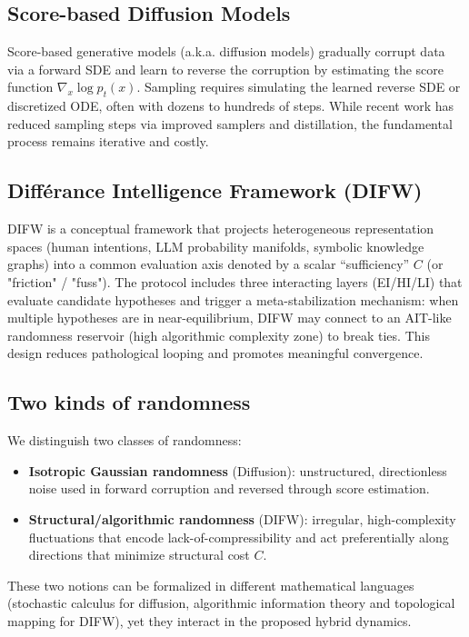 \documentclass[11pt]{article}
\begin{document}
\subsection{Score-based Diffusion Models}
Score-based generative models (a.k.a. diffusion models) gradually corrupt data via a forward
SDE and learn to reverse the corruption by estimating the score function $\nabla_x \log p_t(x)$.
Sampling requires simulating the learned reverse SDE or discretized ODE, often with dozens to
hundreds of steps. While recent work has reduced sampling steps via improved samplers
and distillation, the fundamental process remains iterative and costly.

\subsection{Différance Intelligence Framework (DIFW)}
DIFW is a conceptual framework that projects heterogeneous representation spaces (human
intentions, LLM probability manifolds, symbolic knowledge graphs) into a common evaluation
axis denoted by a scalar ``sufficiency'' $C$ (or "friction" / "fuss"). The protocol includes
three interacting layers (EI/HI/LI) that evaluate candidate hypotheses and trigger a
meta-stabilization mechanism: when multiple hypotheses are in near-equilibrium, DIFW may
connect to an AIT-like randomness reservoir (high algorithmic complexity zone) to break ties.
This design reduces pathological looping and promotes meaningful convergence.

\subsection{Two kinds of randomness}
We distinguish two classes of randomness:
\begin{itemize}
  \item \textbf{Isotropic Gaussian randomness} (Diffusion): unstructured, directionless noise used
  in forward corruption and reversed through score estimation.
  \item \textbf{Structural/algorithmic randomness} (DIFW): irregular, high-complexity fluctuations
  that encode lack-of-compressibility and act preferentially along directions that minimize
  structural cost $C$.
\end{itemize}
These two notions can be formalized in different mathematical languages (stochastic calculus
for diffusion, algorithmic information theory and topological mapping for DIFW), yet they
interact in the proposed hybrid dynamics.
\end{document}
